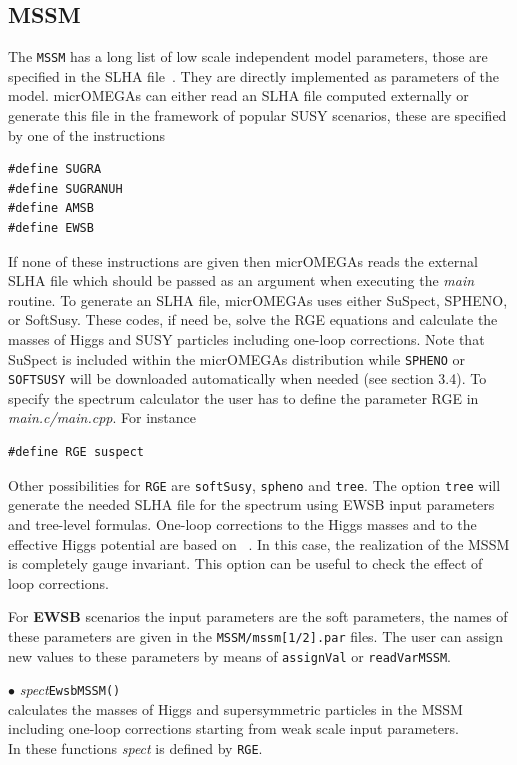\documentclass[12pt,a4paper]{article}
\begin{document}
\subsection{MSSM}
The {\tt MSSM} has a long list of low scale  independent model 
parameters, those are specified in the SLHA file~\cite{Skands:2003cj,Allanach:2008qq}.
They are directly implemented as parameters of the model.
micrOMEGAs can either read an SLHA file computed externally or
generate  this file in the  framework of  popular  SUSY scenarios, these are specified by one of the instructions
\begin{verbatim}
#define SUGRA
#define SUGRANUH
#define AMSB 
#define EWSB
\end{verbatim}  
If none of these instructions are given then micrOMEGAs reads the external SLHA file which should be passed as an argument  when executing the {\it main} routine. 
To generate  an SLHA file,  micrOMEGAs uses either SuSpect, SPHENO, or SoftSusy. These codes, if need be, solve the RGE equations and calculate the masses of Higgs and SUSY particles including one-loop corrections.  Note that SuSpect  is included within the micrOMEGAs distribution while  {\tt SPHENO} or {\tt SOFTSUSY} will be downloaded automatically when needed (see section 3.4).
To specify  the spectrum calculator  the user has to define the parameter RGE  in {\it main.c/main.cpp}. For instance
\begin{verbatim}
#define RGE suspect
\end{verbatim}  
Other possibilities for \verb|RGE| are  \verb|softSusy|, \verb|spheno| and \verb|tree|. The option \verb|tree| will generate the needed SLHA file for the spectrum  using  EWSB input parameters and tree-level formulas. One-loop corrections to the Higgs masses and to the effective Higgs potential are based on ~\cite{Carena:1995wu}. In this case, the realization of the MSSM is  completely gauge invariant. This option can be useful to check the 
effect of loop corrections.    


For {\bf EWSB} scenarios the input parameters are  the soft parameters, the names 
of these parameters are given in the {\tt MSSM/mssm[1/2].par} files.
The user  can assign new values to these parameters by means of {\tt assignVal}
or {\tt readVarMSSM}.  

\noindent $\bullet$ {\it spect}\verb|EwsbMSSM()|\\
 calculates the  masses of Higgs  and
supersymmetric particles in the MSSM including one-loop
corrections starting from weak scale input parameters. \\
In these functions {\it spect}  is defined by \verb|RGE|.
 
\end{document}
